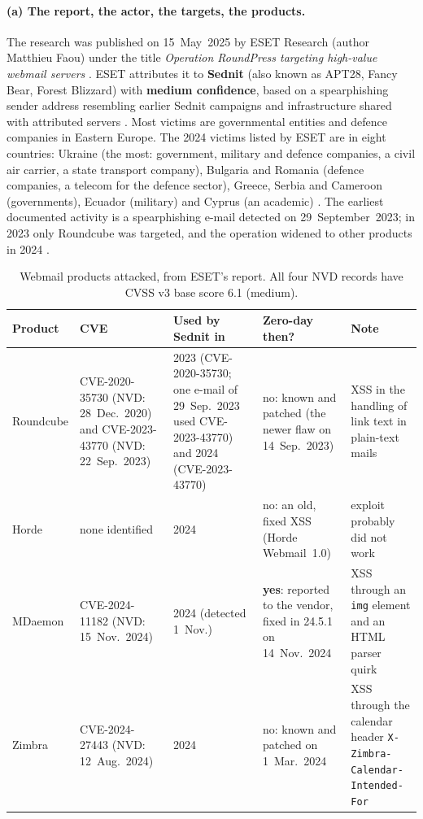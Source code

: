 \documentclass[11pt,a4paper]{article}
\newcommand{\code}[1]{\texttt{#1}}
\begin{document}
\paragraph{(a) The report, the actor, the targets, the products.} The research was published on 15~May~2025 by ESET
Research (author Matthieu Faou) under the title \emph{Operation RoundPress targeting high-value webmail servers}
\cite{eset}. ESET attributes it to \textbf{Sednit} (also known as APT28, Fancy Bear, Forest Blizzard) with
\textbf{medium confidence}, based on a spearphishing sender address resembling earlier Sednit campaigns and
infrastructure shared with attributed servers \cite{eset}. Most victims are governmental entities and defence
companies in Eastern Europe. The 2024 victims listed by ESET are in eight countries: Ukraine (the most:
government, military and defence companies, a civil air carrier, a state transport company), Bulgaria and Romania
(defence companies, a telecom for the defence sector), Greece, Serbia and Cameroon (governments), Ecuador (military)
and Cyprus (an academic) \cite{eset}. The earliest documented activity is a spearphishing e-mail detected on
29~September~2023; in 2023 only Roundcube was targeted, and the operation widened to other products in 2024 \cite{eset}.
\begin{table}[H]
\centering\footnotesize
\begin{tabularx}{\textwidth}{@{}P{1.55cm}P{3.9cm}P{2.0cm}P{2.4cm}L@{}}
\toprule
Product & CVE & Used by Sednit in & Zero-day then? & Note \\
\midrule
Roundcube & CVE-2020-35730 (NVD: 28~Dec.\ 2020) and CVE-2023-43770 (NVD: 22~Sep.\ 2023) & 2023 (CVE-2020-35730; one e-mail of 29~Sep.\ 2023 used CVE-2023-43770) and 2024 (CVE-2023-43770) &
no: known and patched (the newer flaw on 14~Sep.\ 2023) & XSS in the handling of link text in plain-text mails \cite{eset,nvd} \\
Horde & none identified & 2024 & no: an old, fixed XSS (Horde Webmail~1.0) & exploit probably did not work \cite{eset} \\
MDaemon & CVE-2024-11182 (NVD: 15~Nov.\ 2024) & 2024 (detected 1~Nov.) & \textbf{yes}: reported to the vendor, fixed in 24.5.1 on
14~Nov.\ 2024 & XSS through an \code{img} element and an HTML parser quirk \cite{eset,nvd} \\
Zimbra & CVE-2024-27443 (NVD: 12~Aug.\ 2024) & 2024 & no: known and patched on 1~Mar.\ 2024 &
XSS through the calendar header \code{X-Zimbra-Calendar-\allowbreak Intended-For} \cite{eset,nvd} \\
\bottomrule
\end{tabularx}
\caption{Webmail products attacked, from ESET's report. All four NVD records have CVSS v3 base score 6.1 (medium).}\label{tab:webmail}
\end{table}
\end{document}
